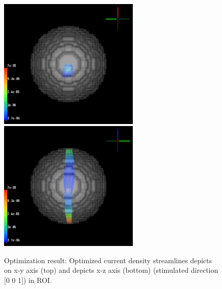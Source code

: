 \documentclass[fleqn,11pt,openany]{book}
\begin{document}
\begin{figure}[!h]
\centering
\includegraphics[width=0.6\textwidth]{ElectricalBrainStimulationTutorial_figures/opt_sol_downz.png}
\includegraphics[width=0.6\textwidth]{ElectricalBrainStimulationTutorial_figures/opt_sol_downx.png}

\caption{Optimization result: Optimized current density streamlines depicts on x-y axis (top) and depicts x-z axis (bottom) (stimulated direction [0 0 1]) in ROI.}
\label{fig:opt_sol}
\end{figure}
\end{document}
